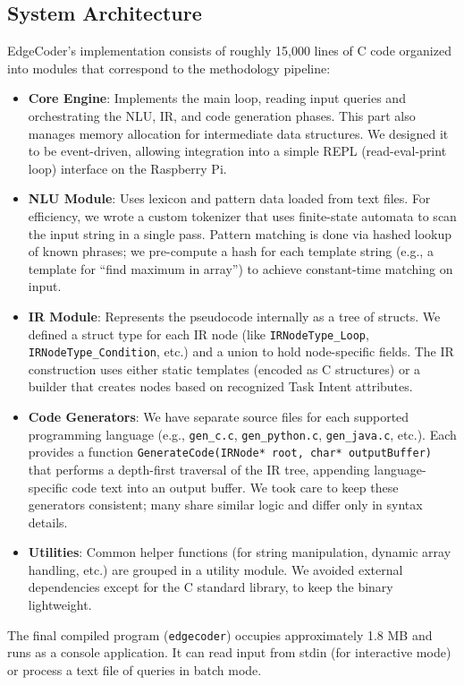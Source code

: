 \documentclass[12pt]{article}
\begin{document}
\subsection{System Architecture}
EdgeCoder's implementation consists of roughly 15,000 lines of C code organized into modules that correspond to the methodology pipeline:
\begin{itemize}
    \item \textbf{Core Engine}: Implements the main loop, reading input queries and orchestrating the NLU, IR, and code generation phases. This part also manages memory allocation for intermediate data structures. We designed it to be event-driven, allowing integration into a simple REPL (read-eval-print loop) interface on the Raspberry Pi.
    \item \textbf{NLU Module}: Uses lexicon and pattern data loaded from text files. For efficiency, we wrote a custom tokenizer that uses finite-state automata to scan the input string in a single pass. Pattern matching is done via hashed lookup of known phrases; we pre-compute a hash for each template string (e.g., a template for “find maximum in array”) to achieve constant-time matching on input.
    \item \textbf{IR Module}: Represents the pseudocode internally as a tree of structs. We defined a struct type for each IR node (like \texttt{IRNodeType\_Loop}, \texttt{IRNodeType\_Condition}, etc.) and a union to hold node-specific fields. The IR construction uses either static templates (encoded as C structures) or a builder that creates nodes based on recognized Task Intent attributes.
    \item \textbf{Code Generators}: We have separate source files for each supported programming language (e.g., \texttt{gen\_c.c}, \texttt{gen\_python.c}, \texttt{gen\_java.c}, etc.). Each provides a function \texttt{GenerateCode(IRNode* root, char* outputBuffer)} that performs a depth-first traversal of the IR tree, appending language-specific code text into an output buffer. We took care to keep these generators consistent; many share similar logic and differ only in syntax details.
    \item \textbf{Utilities}: Common helper functions (for string manipulation, dynamic array handling, etc.) are grouped in a utility module. We avoided external dependencies except for the C standard library, to keep the binary lightweight.
\end{itemize}
The final compiled program (\texttt{edgecoder}) occupies approximately 1.8 MB and runs as a console application. It can read input from stdin (for interactive mode) or process a text file of queries in batch mode.
\end{document}
